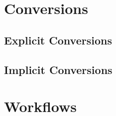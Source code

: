\section{Conversions}

\subsection{Explicit Conversions}

\subsection{Implicit Conversions}
\label{sec:implicit-conversions}

\section{Workflows}
\label{sec:workflows}




